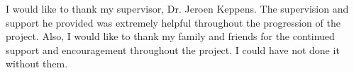 
I would like to thank my supervisor, Dr. Jeroen Keppens. The supervision and support he provided was extremely helpful throughout the progression of the project. Also, I would like to thank my family and friends for the continued support and encouragement throughout the project. I could have not done it without them.